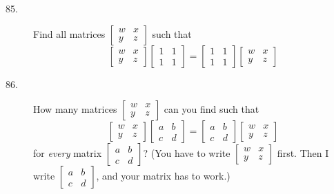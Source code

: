 \documentclass{article}
\begin{document}
\begin{description}
  \item[85.] Find all matrices $\begin{bmatrix} w & x \\ y & z \end{bmatrix}$ such that
    \begin{equation*}
    \begin{bmatrix} w & x \\ y & z \end{bmatrix} \begin{bmatrix} 1 & 1 \\ 1 & 1 \end{bmatrix}
    = \begin{bmatrix} 1 & 1 \\ 1 & 1 \end{bmatrix} \begin{bmatrix} w & x \\ y & z \end{bmatrix}
    \end{equation*}

  \item[86.] How many matrices $\begin{bmatrix} w & x \\ y & z \end{bmatrix}$ can you find such that
    \begin{equation*}
    \begin{bmatrix} w & x \\ y & z \end{bmatrix} \begin{bmatrix} a & b \\ c & d \end{bmatrix}
    = \begin{bmatrix} a & b \\ c & d \end{bmatrix} \begin{bmatrix} w & x \\ y & z \end{bmatrix}
    \end{equation*}
    for \emph{every} matrix $\begin{bmatrix} a & b \\ c & d \end{bmatrix}$? (You have to write $\begin{bmatrix} w & x \\ y & z \end{bmatrix}$ first. Then I write $\begin{bmatrix} a & b \\ c & d \end{bmatrix}$, and your matrix has to work.) 


\end{description}
\end{document}
